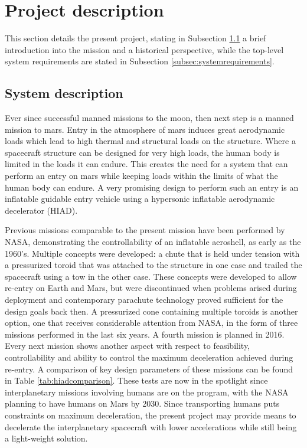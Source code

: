 \section{Project description}\label{cha:project_description}%
This section details the present project, stating in Subsection \ref{subsec:systemdescription} a brief introduction into the mission and a historical perspective, while the top-level system requirements are stated in Subsection \ref{subsec:systemrequirements}.

\subsection{System description} 
\label{subsec:systemdescription}
Ever since successful manned missions to the moon, then next step is a manned mission to mars. Entry in the atmosphere of mars induces great aerodynamic loads which lead to high thermal and structural loads on the structure. Where a spacecraft structure can be designed for very high loads, the human body is limited in the loads it can endure. This creates the need for a system that can perform an entry on mars while keeping loads within the limits of what the human body can endure. A very promising design to perform such an entry is an inflatable guidable entry vehicle using a hypersonic inflatable aerodynamic decelerator (HIAD).

Previous missions comparable to the present mission have been performed by NASA, demonstrating the controllability of an inflatable aeroshell, as early as the 1960's. Multiple concepts were developed: a chute that is held under tension with a pressurized toroid that was attached to the structure in one case and trailed the spacecraft using a tow in the other case. These concepts were developed to allow re-entry on Earth and Mars, but were discontinued when problems arised during deployment and contemporary parachute technology proved sufficient for the design goals back then. \citep{hiadhistory}
A pressurized cone containing multiple toroids is another option, one that receives considerable attention from NASA, in the form of three missions performed in the last six years. A fourth mission is planned in 2016. Every next mission shows another aspect with respect to feasibility, controllability and ability to control the maximum deceleration achieved during re-entry. A comparison of key design parameters of these missions can be found in Table \ref{tab:hiadcomparison}.
These tests are now in the spotlight since interplanetary missions involving humans are on the program, with the NASA planning to have humans on Mars by 2030. Since transporting humans puts constraints on maximum deceleration, the present project may provide means to decelerate the interplanetary spacecraft with lower accelerations while still being a light-weight solution.

